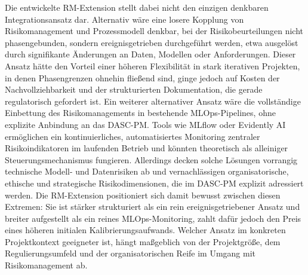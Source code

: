 Die entwickelte RM-Extension stellt dabei nicht den einzigen denkbaren Integrationsansatz dar. 
Alternativ wäre eine losere Kopplung von Risikomanagement und Prozessmodell denkbar, 
bei der Risikobeurteilungen nicht phasengebunden, sondern ereignisgetrieben durchgeführt 
werden, etwa ausgelöst durch signifikante Änderungen an Daten, Modellen oder Anforderungen. 
Dieser Ansatz hätte den Vorteil einer höheren Flexibilität in stark iterativen Projekten, 
in denen Phasengrenzen ohnehin fließend sind, ginge jedoch auf Kosten 
der Nachvollziehbarkeit und der strukturierten Dokumentation, die gerade regulatorisch gefordert ist. 
Ein weiterer alternativer Ansatz wäre die vollständige Einbettung des Risikomanagements in bestehende MLOps-Pipelines, 
ohne explizite Anbindung an das DASC-PM. Tools wie MLflow oder Evidently AI ermöglichen ein kontinuierliches, 
automatisiertes Monitoring zentraler Risikoindikatoren im laufenden Betrieb und könnten theoretisch 
als alleiniger Steuerungsmechanismus fungieren. Allerdings decken solche Lösungen vorrangig technische 
Modell- und Datenrisiken ab und vernachlässigen organisatorische, ethische und strategische Risikodimensionen, 
die im DASC-PM explizit adressiert werden. Die RM-Extension positioniert sich 
damit bewusst zwischen diesen Extremen: Sie ist stärker strukturiert als ein rein ereignisgetriebener 
Ansatz und breiter aufgestellt als ein reines MLOps-Monitoring, zahlt dafür jedoch den 
Preis eines höheren initialen Kalibrierungsaufwands. Welcher Ansatz im konkreten Projektkontext geeigneter ist, 
hängt maßgeblich von der Projektgröße, dem Regulierungsumfeld und der organisatorischen Reife im Umgang mit Risikomanagement ab.